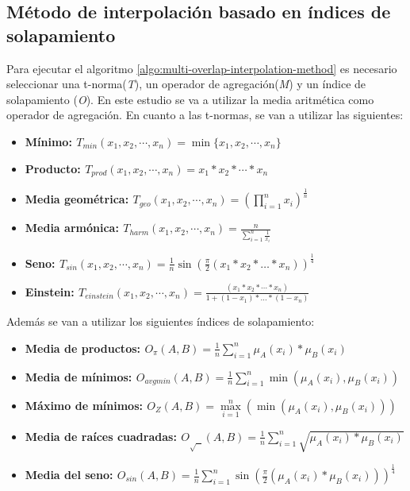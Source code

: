 \subsection{Método de interpolación basado en índices de solapamiento}\label{sec:fire-detection-interpolation-method}
Para ejecutar el algoritmo \ref{algo:multi-overlap-interpolation-method} es necesario seleccionar una t-norma(\emph{T}), un operador de agregación(\emph{M}) y un índice de solapamiento (\emph{O}). En este estudio se va a utilizar la media aritmética como operador de agregación. En cuanto a las t-normas, se van a utilizar las siguientes:

\begin{itemize}
	\item \bfseries Mínimo: $T_{min}(x_{1},x_{2},\cdots,x_{n}) = \min\{x_{1},x_{2},\cdots,x_{n}\}$
	\item \bfseries Producto: $T_{prod}(x_{1},x_{2},\cdots,x_{n}) = x_{1}*x_{2} * \cdots * x_{n}$
	\item \bfseries Media geométrica: $T_{geo}(x_{1},x_{2},\cdots,x_{n}) = (\prod\limits_{i=1}^{n}x_{i})^{\frac{1}{n}}$
	\item \bfseries Media armónica: $T_{harm}(x_{1},x_{2},\cdots,x_{n}) = \frac{n}{\sum_{i=1}^{n}\frac{1}{x_i}}$
	\item \bfseries Seno: $T_{sin}(x_{1},x_{2},\cdots,x_{n}) = \frac{1}{n}\sin(\frac{\pi}{2}(x_1 * x_2 * \ldots * x_n))^{\frac{1}{4}}$
	\item \bfseries Einstein: $T_{einstein}(x_{1},x_{2},\cdots,x_{n}) = \frac{(x_{1}*x_{2} * \cdots * x_{n})}{1 + (1 - x_{1} )* \ldots * (1 - x_{n} )}$
\end{itemize}

Además se van a utilizar los siguientes índices de solapamiento:

\begin{itemize}
	\item \bfseries Media de productos: $O_{\pi}(A,B) = \frac{1}{n}\sum_{i=1}^{n}\mu_A(x_i)*\mu_B(x_i)$
	\item \bfseries Media de mínimos: $O_{avgmin}(A,B) = \frac{1}{n}\sum_{i=1}^{n}\min(\mu_A(x_i),\mu_B(x_i))$
	\item \bfseries Máximo de mínimos: $O_{Z}(A,B) = \max\limits_{i=1}^{n}(\min(\mu_A(x_i),\mu_B(x_i)))$
	\item \bfseries Media de raíces cuadradas: $O_{\sqrt{\text{ }}}(A,B) =  \frac{1}{n}\sum_{i=1}^{n}\sqrt{\mu_A(x_i)*\mu_B(x_i)}$
	\item \bfseries Media del seno:  $O_{sin}(A, B) = \frac{1}{n}\sum_{i=1}^{n}\sin(\frac{\pi}{2}(\mu_A(x_i)*\mu_B(x_i)))^{\frac{1}{4}}$
\end{itemize}


